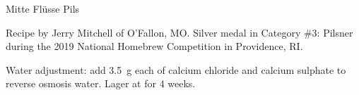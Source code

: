 \stylesection{\stylegermanpils}

\begin{recipe}{Mitte Flüsse Pils}

\begin{aboutblock}
Recipe by Jerry Mitchell of O'Fallon, MO. Silver medal in Category \#3: Pilsner
during the 2019 National Homebrew Competition in Providence, RI. \sourceaha
\end{aboutblock}


\begin{methodandtiming}
 
\begin{mashsteps}
\end{mashsteps}

\begin{fermentationsteps}
\end{fermentationsteps}

\begin{directions}
Water adjustment: add 3.5~g each of calcium chloride and calcium sulphate to
reverse osmosis water. Lager at  for 4 weeks.
\end{directions}

\end{methodandtiming}

\recipebreak

\begin{ingredientsblock}

\begin{malts}
\end{malts}

\begin{hops}
\end{hops}


\end{ingredientsblock}

\end{recipe}

